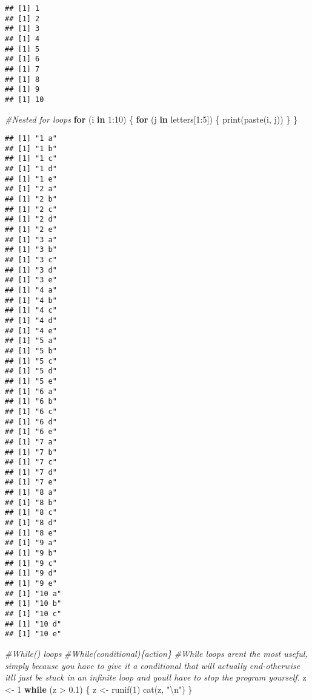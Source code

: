 \documentclass[
]{article}
\newenvironment{Shaded}{\begin{snugshade}}{\end{snugshade}}
\newcommand{\CommentTok}[1]{\textcolor[rgb]{0.56,0.35,0.01}{\textit{#1}}}
\newcommand{\ControlFlowTok}[1]{\textcolor[rgb]{0.13,0.29,0.53}{\textbf{#1}}}
\newcommand{\DecValTok}[1]{\textcolor[rgb]{0.00,0.00,0.81}{#1}}
\newcommand{\FloatTok}[1]{\textcolor[rgb]{0.00,0.00,0.81}{#1}}
\newcommand{\FunctionTok}[1]{\textcolor[rgb]{0.00,0.00,0.00}{#1}}
\newcommand{\NormalTok}[1]{#1}
\newcommand{\OtherTok}[1]{\textcolor[rgb]{0.56,0.35,0.01}{#1}}
\newcommand{\SpecialCharTok}[1]{\textcolor[rgb]{0.00,0.00,0.00}{#1}}
\newcommand{\StringTok}[1]{\textcolor[rgb]{0.31,0.60,0.02}{#1}}
\begin{document}
\begin{verbatim}
## [1] 1
## [1] 2
## [1] 3
## [1] 4
## [1] 5
## [1] 6
## [1] 7
## [1] 8
## [1] 9
## [1] 10
\end{verbatim}

\begin{Shaded}
\begin{Highlighting}[]
\CommentTok{\#Nested for loops}
\ControlFlowTok{for}\NormalTok{ (i }\ControlFlowTok{in} \DecValTok{1}\SpecialCharTok{:}\DecValTok{10}\NormalTok{) \{}
  \ControlFlowTok{for}\NormalTok{ (j }\ControlFlowTok{in}\NormalTok{ letters[}\DecValTok{1}\SpecialCharTok{:}\DecValTok{5}\NormalTok{]) \{}
    \FunctionTok{print}\NormalTok{(}\FunctionTok{paste}\NormalTok{(i, j))}
\NormalTok{  \}}
\NormalTok{\}}
\end{Highlighting}
\end{Shaded}

\begin{verbatim}
## [1] "1 a"
## [1] "1 b"
## [1] "1 c"
## [1] "1 d"
## [1] "1 e"
## [1] "2 a"
## [1] "2 b"
## [1] "2 c"
## [1] "2 d"
## [1] "2 e"
## [1] "3 a"
## [1] "3 b"
## [1] "3 c"
## [1] "3 d"
## [1] "3 e"
## [1] "4 a"
## [1] "4 b"
## [1] "4 c"
## [1] "4 d"
## [1] "4 e"
## [1] "5 a"
## [1] "5 b"
## [1] "5 c"
## [1] "5 d"
## [1] "5 e"
## [1] "6 a"
## [1] "6 b"
## [1] "6 c"
## [1] "6 d"
## [1] "6 e"
## [1] "7 a"
## [1] "7 b"
## [1] "7 c"
## [1] "7 d"
## [1] "7 e"
## [1] "8 a"
## [1] "8 b"
## [1] "8 c"
## [1] "8 d"
## [1] "8 e"
## [1] "9 a"
## [1] "9 b"
## [1] "9 c"
## [1] "9 d"
## [1] "9 e"
## [1] "10 a"
## [1] "10 b"
## [1] "10 c"
## [1] "10 d"
## [1] "10 e"
\end{verbatim}

\begin{Shaded}
\begin{Highlighting}[]
\CommentTok{\#While() loops}
\CommentTok{\#While(conditional)\{action\}}
\CommentTok{\#While loops aren\textquotesingle{}t the most useful, simply because you have to give it a conditional that will actually end{-}otherwise it\textquotesingle{}ll just be stuck in an infinite loop and you\textquotesingle{}ll have to stop the program yourself.}
\NormalTok{z }\OtherTok{\textless{}{-}} \DecValTok{1}
\ControlFlowTok{while}\NormalTok{ (z }\SpecialCharTok{\textgreater{}} \FloatTok{0.1}\NormalTok{) \{}
\NormalTok{  z }\OtherTok{\textless{}{-}} \FunctionTok{runif}\NormalTok{(}\DecValTok{1}\NormalTok{)}
  \FunctionTok{cat}\NormalTok{(z, }\StringTok{"}\SpecialCharTok{\textbackslash{}n}\StringTok{"}\NormalTok{)}
\NormalTok{\}}
\end{Highlighting}
\end{Shaded}
\end{document}
